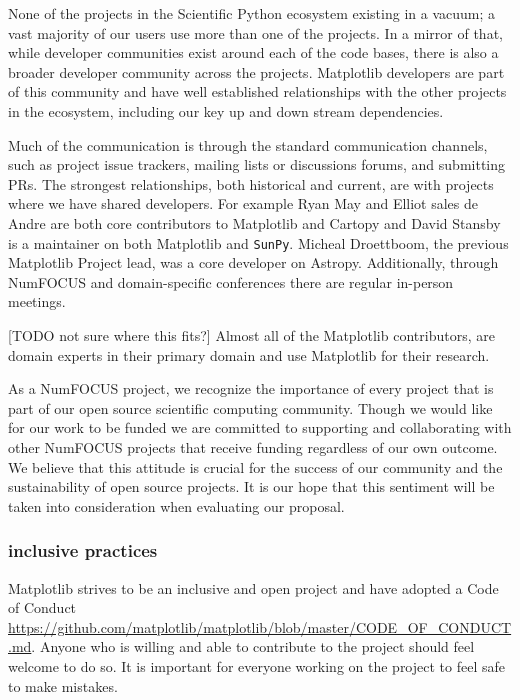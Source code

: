 \documentclass[12pt]{article}
\numberwithin{page}{section}
\begin{document}
None of the projects in the Scientific Python ecosystem existing in a
vacuum; a vast majority of our users use more than one of the
projects.  In a mirror of that, while developer communities exist
around each of the code bases, there is also a broader developer
community across the projects.  Matplotlib developers are part of this
community and have well established relationships with the other
projects in the ecosystem, including our key up and down stream
dependencies.

Much of the communication is through the standard communication
channels, such as project issue trackers, mailing lists or discussions
forums, and submitting PRs.  The strongest relationships, both
historical and current, are with projects where we have shared
developers.  For example Ryan May and Elliot sales de Andre are both
core contributors to Matplotlib and Cartopy and David Stansby is a
maintainer on both Matplotlib and \texttt{SunPy}.  Micheal Droettboom,
the previous Matplotlib Project lead, was a core developer on Astropy.
Additionally, through NumFOCUS and domain-specific conferences there
are regular in-person meetings.

[TODO not sure where this fits?] Almost all of the Matplotlib
contributors, are domain experts in their primary domain and use
Matplotlib for their research.


As a NumFOCUS project, we recognize the importance of every project
that is part of our open source scientific computing community. Though
we would like for our work to be funded we are committed to supporting
and collaborating with other NumFOCUS projects that receive funding
regardless of our own outcome. We believe that this attitude is
crucial for the success of our community and the sustainability of
open source projects. It is our hope that this sentiment will be taken
into consideration when evaluating our proposal.


\subsubsection{inclusive practices}

Matplotlib strives to be an inclusive and open project and have
adopted a Code of Conduct
\url{https://github.com/matplotlib/matplotlib/blob/master/CODE_OF_CONDUCT.md}. Anyone
who is willing and able to contribute to the project should feel
welcome to do so.  It is important for everyone working on the project
to feel safe to make mistakes.
\end{document}
